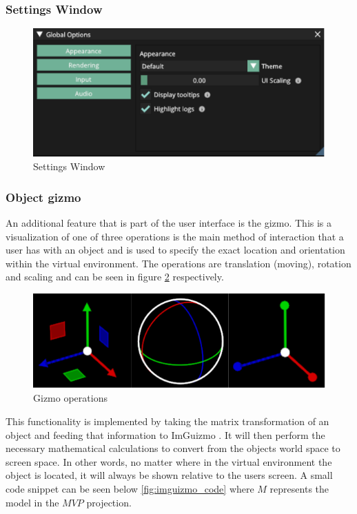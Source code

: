 \documentclass[11pt]{article}
\begin{document}
\subsubsection{Settings Window}

\begin{figure}[h!]
  \centering
  \includegraphics[width=\textwidth]{images/settings_window.png}
  \caption{Settings Window}
  \label{fig:settings_window}
\end{figure}

\subsubsection{Object gizmo}
An additional feature that is part of the user interface is the gizmo. This is a
visualization of one of three operations is the main method of interaction that
a user has with an object and is used to specify the exact location and
orientation within the virtual environment. The operations are translation
(moving), rotation and scaling and can be seen in figure \ref{fig:gizmo}
respectively.
\begin{figure}[h!]
  \centering
  \includegraphics[width=\textwidth]{images/gizmo.png}
  \caption{Gizmo operations}
  \label{fig:gizmo}
\end{figure}

This functionality is implemented by taking the matrix transformation of an
object and feeding that information to ImGuizmo \cite{imguizmo}. It will then
perform the necessary mathematical calculations to convert from the objects
world space to screen space. In other words, no matter where in the virtual
environment the object is located, it will always be shown relative to the users
screen. A small code snippet can be seen below \ref{fig:imguizmo_code} where
\(M\) represents the model in the \(MVP\) projection.
\end{document}
